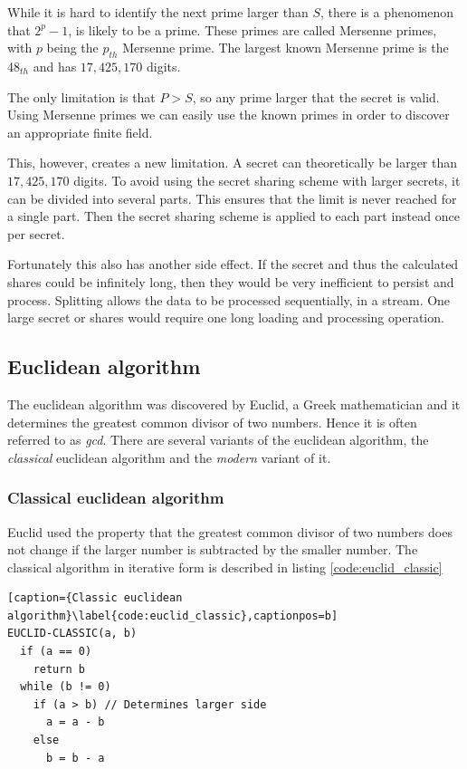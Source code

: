 While it is hard to identify the next prime larger than $S$, there is a
phenomenon that $2^p-1$, is likely to be a prime. These primes are called
Mersenne primes, with $p$ being the $p_{th}$ Mersenne prime. The largest known
Mersenne prime is the 48$_{th}$ and has $17,425,170$ digits.
\cite{largest_prime}

The only limitation is that $P > S$, so any prime larger that the
secret is valid. Using Mersenne primes we can easily use the known primes in
order to discover an appropriate finite field.

This, however, creates a new limitation. A secret can theoretically be larger
than $17,425,170$ digits. To avoid using the secret sharing scheme with larger
secrets, it can be divided into several parts. This ensures that the limit
is never reached for a single part. Then the secret sharing scheme is applied to
each part instead once per secret.

Fortunately this also has another side effect. If the secret and thus the
calculated shares could be infinitely long, then they would be very inefficient
to persist and process. Splitting allows the data to be processed sequentially,
in a stream. One large secret or shares would require one long loading and
processing operation.

\subsection{Euclidean algorithm}

The euclidean algorithm was discovered by Euclid, a Greek mathematician and it
determines the greatest common divisor of two numbers.
Hence it is often referred to as \textit{gcd}. There are several variants
of the euclidean algorithm, the \textit{classical} euclidean algorithm and the
\textit{modern} variant of it.

\subsubsection{Classical euclidean algorithm}

Euclid used the property that the greatest common divisor of two numbers does
not change if the larger number is subtracted by the smaller number. The classical
algorithm in iterative form is described in listing \ref{code:euclid_classic}

\begin{lstlisting}[caption={Classic euclidean algorithm}\label{code:euclid_classic},captionpos=b]
EUCLID-CLASSIC(a, b)
  if (a == 0)
    return b
  while (b != 0)
    if (a > b) // Determines larger side
      a = a - b
    else
      b = b - a
\end{lstlisting}


